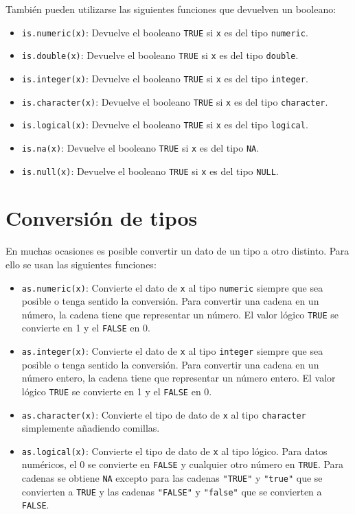 \documentclass[
  a4paper,
]{scrreport}
\providecommand{\tightlist}{%
  \setlength{\itemsep}{0pt}\setlength{\parskip}{0pt}}\usepackage{longtable,booktabs,array}
\theoremstyle{definition}
\theoremstyle{definition}
\theoremstyle{remark}
\begin{document}
También pueden utilizarse las siguientes funciones que devuelven un
booleano:

\begin{itemize}
\tightlist
\item
  \texttt{is.numeric(x)}: Devuelve el booleano \texttt{TRUE} si
  \texttt{x} es del tipo \texttt{numeric}.
\item
  \texttt{is.double(x)}: Devuelve el booleano \texttt{TRUE} si
  \texttt{x} es del tipo \texttt{double}.
\item
  \texttt{is.integer(x)}: Devuelve el booleano \texttt{TRUE} si
  \texttt{x} es del tipo \texttt{integer}.
\item
  \texttt{is.character(x)}: Devuelve el booleano \texttt{TRUE} si
  \texttt{x} es del tipo \texttt{character}.
\item
  \texttt{is.logical(x)}: Devuelve el booleano \texttt{TRUE} si
  \texttt{x} es del tipo \texttt{logical}.
\item
  \texttt{is.na(x)}: Devuelve el booleano \texttt{TRUE} si \texttt{x} es
  del tipo \texttt{NA}.
\item
  \texttt{is.null(x)}: Devuelve el booleano \texttt{TRUE} si \texttt{x}
  es del tipo \texttt{NULL}.
\end{itemize}

\hypertarget{conversiuxf3n-de-tipos}{%
\section{Conversión de tipos}\label{conversiuxf3n-de-tipos}}

En muchas ocasiones es posible convertir un dato de un tipo a otro
distinto. Para ello se usan las siguientes funciones:

\begin{itemize}
\tightlist
\item
  \texttt{as.numeric(x)}: Convierte el dato de \texttt{x} al tipo
  \texttt{numeric} siempre que sea posible o tenga sentido la
  conversión. Para convertir una cadena en un número, la cadena tiene
  que representar un número. El valor lógico \texttt{TRUE} se convierte
  en 1 y el \texttt{FALSE} en 0.
\item
  \texttt{as.integer(x)}: Convierte el dato de \texttt{x} al tipo
  \texttt{integer} siempre que sea posible o tenga sentido la
  conversión. Para convertir una cadena en un número entero, la cadena
  tiene que representar un número entero. El valor lógico \texttt{TRUE}
  se convierte en 1 y el \texttt{FALSE} en 0.
\item
  \texttt{as.character(x)}: Convierte el tipo de dato de \texttt{x} al
  tipo \texttt{character} simplemente añadiendo comillas.
\item
  \texttt{as.logical(x)}: Convierte el tipo de dato de \texttt{x} al
  tipo lógico. Para datos numéricos, el 0 se convierte en \texttt{FALSE}
  y cualquier otro número en \texttt{TRUE}. Para cadenas se obtiene
  \texttt{NA} excepto para las cadenas \texttt{"TRUE"} y \texttt{"true"}
  que se convierten a \texttt{TRUE} y las cadenas \texttt{"FALSE"} y
  \texttt{"false"} que se convierten a \texttt{FALSE}.
\end{itemize}
\end{document}
